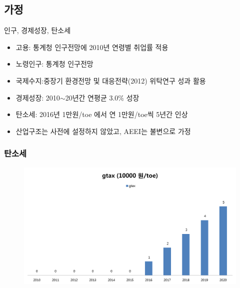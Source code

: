 \documentclass[10pt,compress,slidetop,%
			   hyperref={unicode},xcolor={svgnames},%
			   t]{beamer}
\begin{document}
\subsection{가정}
\begin{frame}{인구, 경제성장, 탄소세}
	\begin{itemize}
		\item {고용: 통계청 인구전망에 2010년 연령별 취업률 적용}
		\bigskip
		\item {노령인구: 통계청 인구전망}
		\bigskip
		\item {국제수지:중장기 환경전망 및 대응전략(2012) 위탁연구 성과 활용}
		\bigskip
		\item {경제성장: 2010$\sim$20년간 연평균 3.0\% 성장}
		\bigskip
		\item {탄소세: 2016년 1만원/toe 에서 연 1만원/toe씩 5년간 인상}
		\bigskip
		\item {산업구조는 사전에 설정하지 않았고, AEEI는 불변으로 가정}
	\end{itemize}
\end{frame}
\begin{frame}
	\frametitle{탄소세}
	\begin{figure}
		\centering
		\includegraphics[width=1.00\textwidth]{ctax.png}
	\end{figure}
\end{frame}
	
\end{document}

